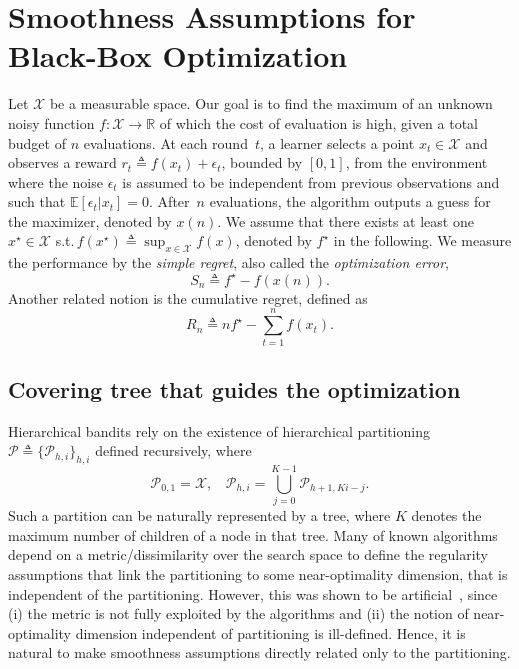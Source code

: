 \section{Smoothness Assumptions for Black-Box Optimization}\label{sec:gpo.pre}

Let $\mathcal{X}$ be a measurable space. Our goal is to find the maximum of an unknown noisy function $f:\mathcal{X}\rightarrow\mathbb{R}$ of which the cost of evaluation is high, given a total budget of $n$ evaluations. At each round~$t$, a learner selects a point $x_t\in\mathcal{X}$ and observes a reward $r_t\triangleq f(x_t)+\epsilon_t$, bounded by $[0,1]$, from the environment where the noise $\epsilon_t$ is assumed to be independent from previous observations and such that $\mathbb{E}[\epsilon_t|x_t] = 0$.
After~$n$ evaluations, the algorithm outputs a guess for the maximizer, denoted by $x(n)$. We assume that there exists at least one $x^\star \in \mathcal{X}$ s.t.\,$f(x^\star) \triangleq \sup_{x\in\mathcal{X}} f(x)$, denoted by $f^\star$ in the following. We measure the performance by the \emph{simple regret}, also called the \textit{optimization error},
\[
	S_n \triangleq f^\star - f(x(n)).
\]
Another related notion is the cumulative regret, defined as
\[
	R_n \triangleq nf^\star - \sum_{t=1}^n f(x_t).
\]

\subsection{Covering tree that guides the optimization}

Hierarchical bandits rely on the existence of hierarchical partitioning $\mathcal{P}\triangleq\{\mathcal{P}_{h,i}\}_{h,i}$ defined recursively, where
\[
	\mathcal{P}_{0,1} = \mathcal{X},  \ \ \ \
	\mathcal{P}_{h,i} = \bigcup_{j=0}^{K-1} \mathcal{P}_{h+1,Ki-j}.
\]
Such a partition can be naturally represented by a tree, where $K$ denotes the maximum number of children of a node in that tree. Many of known algorithms depend on a metric/dissimilarity over the search space to define the regularity assumptions that link the partitioning to some near-optimality dimension, that is independent of the partitioning. However, this was shown to be artificial~\citep{grill2015poo}, since (i) the metric is not fully exploited by the algorithms and (ii) the notion of near-optimality dimension independent of partitioning is ill-defined.
Hence, it is natural to make smoothness assumptions directly related only to the partitioning.

